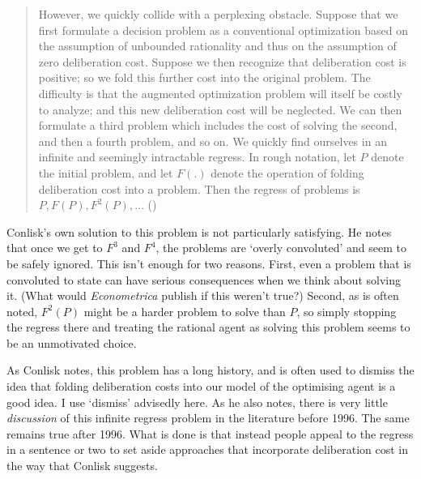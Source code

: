 \documentclass[
  11pt,
  letterpaper,
  DIV=11,
  numbers=noendperiod,
  oneside]{scrartcl}
\begin{document}
\begin{quote}
However, we quickly collide with a perplexing obstacle. Suppose that we
first formulate a decision problem as a conventional optimization based
on the assumption of unbounded rationality and thus on the assumption of
zero deliberation cost. Suppose we then recognize that deliberation cost
is positive; so we fold this further cost into the original problem. The
difficulty is that the augmented optimization problem will itself be
costly to analyze; and this new deliberation cost will be neglected. We
can then formulate a third problem which includes the cost of solving
the second, and then a fourth problem, and so on. We quickly find
ourselves in an infinite and seemingly intractable regress. In rough
notation, let \(P\) denote the initial problem, and let \(F(.)\) denote
the operation of folding deliberation cost into a problem. Then the
regress of problems is \(P, F(P), F^2(P), \ldots\)
()
\end{quote}

Conlisk's own solution to this problem is not particularly satisfying.
He notes that once we get to \(F^3\) and \(F^4\), the problems are
`overly convoluted' and seem to be safely ignored. This isn't enough for
two reasons. First, even a problem that is convoluted to state can have
serious consequences when we think about solving it. (What would
\emph{Econometrica} publish if this weren't true?) Second, as is often
noted, \(F^2(P)\) might be a harder problem to solve than \(P\), so
simply stopping the regress there and treating the rational agent as
solving this problem seems to be an unmotivated choice.

As Conlisk notes, this problem has a long history, and is often used to
dismiss the idea that folding deliberation costs into our model of the
optimising agent is a good idea. I use `dismiss' advisedly here. As he
also notes, there is very little \emph{discussion} of this infinite
regress problem in the literature before 1996. The same remains true
after 1996. What is done is that instead people appeal to the regress in
a sentence or two to set aside approaches that incorporate deliberation
cost in the way that Conlisk suggests.
\end{document}

